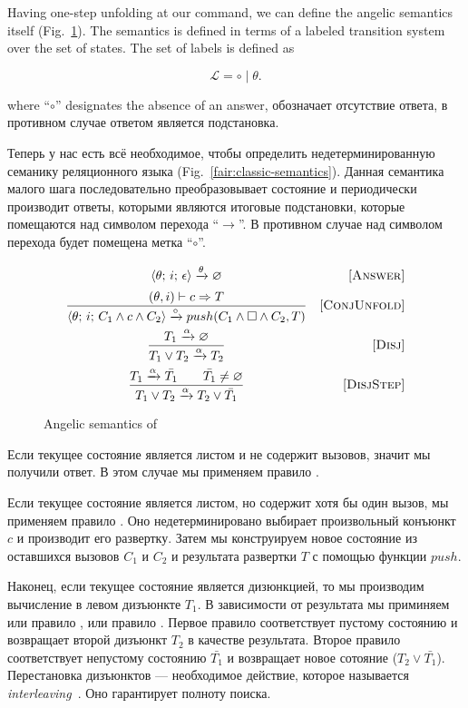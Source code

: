 Having one-step unfolding at our command, we can define the angelic semantics itself (Fig.~\ref{fair:angelic-semantics}). The semantics is defined in terms of a labeled transition
system over the set of states. The set of labels is defined as

\[
\mathcal{L} = \circ \mid \theta.
\]

where ``$\circ$'' designates the absence of an answer, обозначает отсутствие ответа, в противном случае ответом является подстановка.

Теперь у нас есть всё необходимое, чтобы определить недетерминированную семанику реляционного языка (Fig.~\ref{fair:classic-semantics}). Данная семантика малого шага последовательно преобразовывает состояние и периодически производит ответы, которыми являются итоговые подстановки, которые помещаются над символом перехода ``$\xrightarrow{}$''. В противном случае над символом перехода будет помещена метка ``$\circ$''.

\begin{figure}[h!]
\[\begin{array}{cr}
     {\langle \theta;\, i;\, \epsilon \rangle \xrightarrow{\theta} \varnothing}  
&     \mbox{[\textsc{Answer}]} \\[2mm]
\dfrac{(\theta, i) \vdash c \Rightarrow T}
      {\langle \theta;\, i;\, C_1 \land c \land C_2 \rangle \xrightarrow{\circ} push(C_1 \land \Box \land C_2, T)}
&     \mbox{[\textsc{ConjUnfold}]} \\[4mm]
\dfrac{T_1 \xrightarrow{\alpha} \varnothing}
      {T_1 \lor T_2 \xrightarrow{\alpha} T_2}
&     \mbox{[\textsc{Disj}]} \\[4mm]
\dfrac{T_1 \xrightarrow{\alpha} \bar{T_1} \qquad \bar{T_1} \not= \varnothing}
      {T_1 \lor T_2 \xrightarrow{\alpha} T_2 \lor\bar{T_1}}
&     \mbox{[\textsc{DisjStep}]}
\end{array}\]
\caption{Angelic semantics of \mk}
\label{fair:angelic-semantics}
\end{figure}

Если текущее состояние является листом и не содержит вызовов, значит мы получили ответ. В этом случае мы применяем правило .

Если текущее состояние является листом, но содержит хотя бы один вызов, мы применяем правило . Оно недетерминировано выбирает произвольный конъюнкт $c$ и производит его развертку. Затем мы конструируем новое состояние из оставшихся вызовов $C_1$ и $C_2$ и результата развертки $T$ с помощью функции $push$.


Наконец, если текущее состояние является дизюнкцией, то мы производим вычисление в левом дизъюнкте $T_1$. В зависимости от результата мы приминяем или правило , или правило . Первое правило соответствует пустому состоянию и возвращает второй дизъюнкт $T_2$ в качестве результата. Второе правило соответствует непустому состоянию $\bar{T_1}$ и возвращает новое сотояние ($T_2 \lor \bar{T_1}$). Перестановка дизъюнктов --- необходимое действие, которое называется \emph{interleaving}~\cite{fair:interleaving}. Оно гарантирует полноту поиска.

